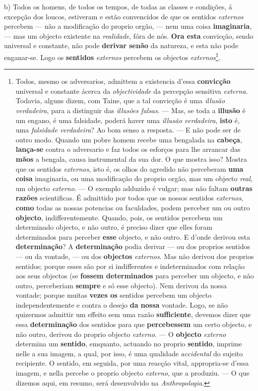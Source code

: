 b) Todos os homens, de todos os tempos, de todas as classes e condições, á excepção dos loucos, estiveram e estão convencidos de que os sentidos \emph{externos} percebem --- não a   modificação do proprio orgão, --- nem uma coisa \textbf{imaginaria}, --- mas um objecto existente na \emph{realidade}, fóra de nós. \textbf{Ora esta} convicção, sendo universal e constante, não pode \textbf{derivar senão} da natureza, e esta não pode enganar-se. Logo os \textbf{sentidos} \emph{externos} percebem os objectos \emph{externos}\footnote{Todos, mesmo os adversarios, admittem a existencia d'essa \textbf{convicção} universal e constante ácerca da \emph{objectividade} da percepção sensitiva \emph{externa}. Todavia, alguns dizem, com Taine, que a tal convicção é uma \emph{illusão verdadeira}, para a distinguir das \emph{illusões falsas}. --- Mas, se toda a \textbf{illusão} é um engano, é uma falsidade, poderá haver uma \emph{illusão verdadeira}, \textbf{isto} é, uma \emph{falsidade verdadeira}? Ao bom senso a resposta. --- E não pode ser de outro modo. Quando um pobre homem recebe uma bengalada na \textbf{cabeça}, \textbf{lança-se} contra o adversario e faz todos os esforços para lhe arrancar das \textbf{mãos} a bengala, causa instrumental da sua dor. O que mostra isso? Mostra que os sentidos \emph{externos}, isto é, os olhos do agredido não perceberam \textbf{uma coisa} imaginaria, ou uma modificação do proprio orgão, mas um objecto \emph{real}, um objecto \emph{externo}. --- O exemplo adduzido é vulgar; mas não faltam \textbf{outras razões} scientificas. É admittido por todos que os nossos sentidos \emph{externos}, \textbf{como} todas as nossas potencias ou faculdades, podem perceber um ou outro \textbf{objecto}, indifferentemente. Quando, pois, os sentidos percebem um determinado objecto, e não outro, é preciso dizer que elles foram determinados para perceber \textbf{esse} objecto, e não outro. E d'onde derivou esta \textbf{determinação}? A \textbf{determinação} podia derivar --- ou dos proprios sentidos --- ou da vontade, --- ou dos \textbf{objectos} \emph{externos}. Mas não derivou dos proprios sentidos; porque esses são por si indifferentes e indeterminados com relação aos seus objectos (se \textbf{fossem determinados} para perceber um objecto, e não outro, perceberiam \textbf{sempre} e só esse objecto). Nem derivou da nossa vontade; porque muitas \textbf{vezes os} sentidos percebem um objecto independentemente e contra o desejo \textbf{da nossa} vontade. Logo, se não quizermos admittir um effeito sem uma razão \textbf{sufficiente}, devemos dizer que essa \textbf{determinação} dos sentidos para que \textbf{percebessem} um certo objecto, e não outro, derivou do proprio objecto \emph{externo}. --- O \textbf{objecto} \emph{externo} determina um \textbf{sentido}, emquanto, actuando no proprio \textbf{sentido}, imprime nelle a sua imagem, a qual, por isso, é uma qualidade \emph{accidental} do sujeito recipiente. O sentido, em seguida, por uma reacção vital, appropria-se d'essa imagem, e nella percebe o proprio objecto \emph{externo}, que a produziu. --- O que dizemos aqui, em resumo, será desenvolvido na \emph{Anthropologia}.}.

